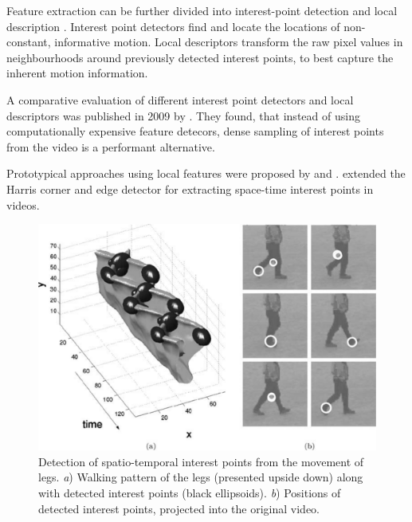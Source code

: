 Feature extraction can be further divided into interest-point detection and local description \cite{poppe_survey_2010}.
Interest point detectors find and locate the locations of non-constant, informative motion.
Local descriptors transform the raw pixel values in neighbourhoods around previously detected interest points, to best capture the inherent motion information. 

A comparative evaluation of different interest point detectors and local descriptors was published in 2009 by \textcite{wang_evaluation_2009}.
They found, that instead of using computationally expensive feature detecors, dense sampling of interest points from the video is a performant alternative. 

Prototypical approaches using local features were proposed by \textcite{laptev_space-time_2005} and \textcite{dollar_behavior_2005}.
\textcite{laptev_space-time_2005} extended the Harris corner and edge detector \cite{harris_combined_1988} for extracting space-time interest points in videos.

\begin{figure}[H]
    \centering
    \includegraphics[width=.8\textwidth]{img_conventional/laptev_stip}
\caption{Detection of spatio-temporal interest points from the movement of legs. \textit{a}) Walking pattern of the legs (presented upside down) along with detected interest points (black ellipsoids). \textit{b}) Positions of detected interest points, projected into the original video. \cite{laptev_space-time_2005}}
    \label{fig:laptev_stip}
\end{figure}

